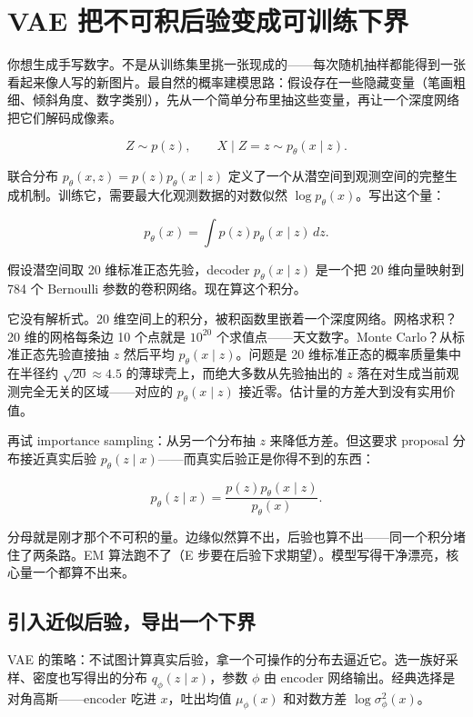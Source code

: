 \section{VAE 把不可积后验变成可训练下界}
\label{sec:14-Deep-Learning/06-Variational-Autoencoders/01}

你想生成手写数字。不是从训练集里挑一张现成的——每次随机抽样都能得到一张看起来像人写的新图片。最自然的概率建模思路：假设存在一些隐藏变量（笔画粗细、倾斜角度、数字类别），先从一个简单分布里抽这些变量，再让一个深度网络把它们解码成像素。

\[
Z\sim p(z),\qquad X\mid Z=z\sim p_\theta(x\mid z).
\]

联合分布 \(p_\theta(x,z)=p(z)p_\theta(x\mid z)\) 定义了一个从潜空间到观测空间的完整生成机制。训练它，需要最大化观测数据的对数似然 \(\log p_\theta(x)\)。写出这个量：

\[
p_\theta(x) = \int p(z)p_\theta(x\mid z)\,dz.
\]

假设潜空间取 20 维标准正态先验，decoder \(p_\theta(x\mid z)\) 是一个把 20 维向量映射到 784 个 Bernoulli 参数的卷积网络。现在算这个积分。

它没有解析式。20 维空间上的积分，被积函数里嵌着一个深度网络。网格求积？20 维的网格每条边 10 个点就是 \(10^{20}\) 个求值点——天文数字。Monte Carlo？从标准正态先验直接抽 \(z\) 然后平均 \(p_\theta(x\mid z)\)。问题是 20 维标准正态的概率质量集中在半径约 \(\sqrt{20}\approx 4.5\) 的薄球壳上，而绝大多数从先验抽出的 \(z\) 落在对生成当前观测完全无关的区域——对应的 \(p_\theta(x\mid z)\) 接近零。估计量的方差大到没有实用价值。

再试 importance sampling：从另一个分布抽 \(z\) 来降低方差。但这要求 proposal 分布接近真实后验 \(p_\theta(z\mid x)\)——而真实后验正是你得不到的东西：

\[
p_\theta(z\mid x) = \frac{p(z)p_\theta(x\mid z)}{p_\theta(x)}.
\]

分母就是刚才那个不可积的量。边缘似然算不出，后验也算不出——同一个积分堵住了两条路。EM 算法跑不了（E 步要在后验下求期望）。模型写得干净漂亮，核心量一个都算不出来。

\subsection{引入近似后验，导出一个下界}

VAE 的策略：不试图计算真实后验，拿一个可操作的分布去逼近它。选一族好采样、密度也写得出的分布 \(q_\phi(z\mid x)\)，参数 \(\phi\) 由 encoder 网络输出。经典选择是对角高斯——encoder 吃进 \(x\)，吐出均值 \(\mu_\phi(x)\) 和对数方差 \(\log\sigma_\phi^2(x)\)。

